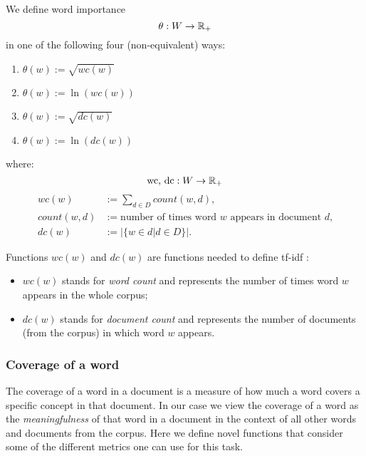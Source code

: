 \begin{definition}
  \label{def:word-importance}
  We define word importance
  \[\theta : W \to \mathbb{R}_+\]
  in one of the following four (non-equivalent) ways:
  \begin{enumerate}
    \item \(\theta(w) := \sqrt{wc(w)}\)
    \item \(\theta(w) := \ln(wc(w))\)
    \item \(\theta(w) := \sqrt{dc(w)}\)
    \item \(\theta(w) := \ln(dc(w))\)
  \end{enumerate}
  where:
  \[\text{wc, dc} : W \to \mathbb{R}_+\]
  \begin{align*}
    wc(w) &:= \sum_{d \in D} count(w, d), \\
    count(w, d) &:= \text{number of times word \(w\) appears in document
      \(d\),} \\
    dc(w) &:= |\{w \in d | d \in D\}|.
  \end{align*}
\end{definition}
Functions \(wc(w)\) and \(dc(w)\) are functions needed to define tf-idf
\cite{}:
\begin{itemize}
  \item \(wc(w)\) stands for \emph{word count} and
    represents the number of times word \(w\) appears in the whole corpus;
  \item \(dc(w)\) stands for \emph{document count} and represents the number of
  documents (from the corpus) in which word \(w\) appears.
\end{itemize}

\subsubsection{Coverage of a word}

The coverage of a word in a document is a measure of how much a word covers a
specific concept in that document. In our case we view the coverage of a word
as the \emph{meaningfulness} of that word in a document in the context of all
other words and documents from the corpus. Here we define novel functions that
consider some of the different metrics one can use for this task.

